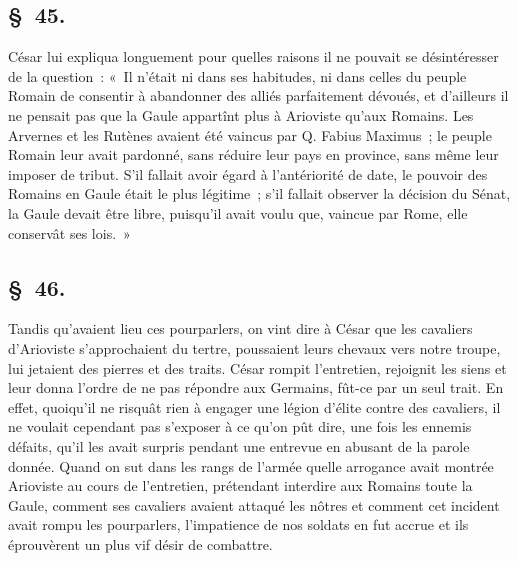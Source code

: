\documentclass[french,twoside]{book} %
\begin{document}
\subsection[{§ 45.}]{ \textsc{§ 45.} }
\noindent César lui expliqua longuement pour quelles raisons il ne pouvait se désintéresser de la question : « Il n’était ni dans ses habitudes, ni dans celles du peuple Romain de consentir à abandonner des alliés parfaitement dévoués, et d’ailleurs il ne pensait pas que la Gaule appartînt plus à Arioviste qu’aux Romains. Les Arvernes et les Rutènes avaient été vaincus par Q. Fabius Maximus ; le peuple Romain leur avait pardonné, sans réduire leur pays en province, sans même leur imposer de tribut. S'il fallait avoir égard à l’antériorité de date, le pouvoir des Romains en Gaule était le plus légitime ; s’il fallait observer la décision du Sénat, la Gaule devait être libre, puisqu’il avait voulu que, vaincue par Rome, elle conservât ses lois. »
\subsection[{§ 46.}]{ \textsc{§ 46.} }
\noindent Tandis qu’avaient lieu ces pourparlers, on vint dire à César que les cavaliers d’Arioviste s’approchaient du tertre, poussaient leurs chevaux vers notre troupe, lui jetaient des pierres et des traits. César rompit l’entretien, rejoignit les siens et leur donna l’ordre de ne pas répondre aux Germains, fût-ce par un seul trait. En effet, quoiqu’il ne risquât rien à engager une légion d’élite contre des cavaliers, il ne voulait cependant pas s’exposer à ce qu’on pût dire, une fois les ennemis défaits, qu’il les avait surpris pendant une entrevue en abusant de la parole donnée. Quand on sut dans les rangs de l’armée quelle arrogance avait montrée Arioviste au cours de l’entretien, prétendant interdire aux Romains toute la Gaule, comment ses cavaliers avaient attaqué les nôtres et comment cet incident avait rompu les pourparlers, l’impatience de nos soldats en fut accrue et ils éprouvèrent un plus vif désir de combattre.
\end{document}
